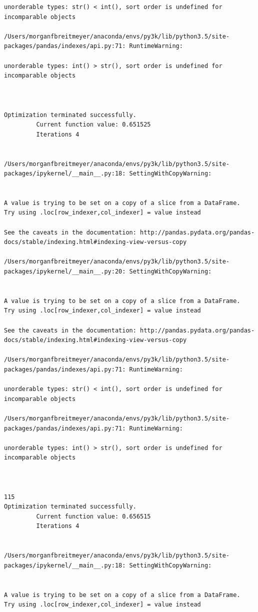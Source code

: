 \begin{lstlisting}
unorderable types: str() < int(), sort order is undefined for incomparable objects

/Users/morganfbreitmeyer/anaconda/envs/py3k/lib/python3.5/site-packages/pandas/indexes/api.py:71: RuntimeWarning:

unorderable types: int() > str(), sort order is undefined for incomparable objects



Optimization terminated successfully.
         Current function value: 0.651525
         Iterations 4


/Users/morganfbreitmeyer/anaconda/envs/py3k/lib/python3.5/site-packages/ipykernel/__main__.py:18: SettingWithCopyWarning:


A value is trying to be set on a copy of a slice from a DataFrame.
Try using .loc[row_indexer,col_indexer] = value instead

See the caveats in the documentation: http://pandas.pydata.org/pandas-docs/stable/indexing.html#indexing-view-versus-copy

/Users/morganfbreitmeyer/anaconda/envs/py3k/lib/python3.5/site-packages/ipykernel/__main__.py:20: SettingWithCopyWarning:


A value is trying to be set on a copy of a slice from a DataFrame.
Try using .loc[row_indexer,col_indexer] = value instead

See the caveats in the documentation: http://pandas.pydata.org/pandas-docs/stable/indexing.html#indexing-view-versus-copy

/Users/morganfbreitmeyer/anaconda/envs/py3k/lib/python3.5/site-packages/pandas/indexes/api.py:71: RuntimeWarning:

unorderable types: str() < int(), sort order is undefined for incomparable objects

/Users/morganfbreitmeyer/anaconda/envs/py3k/lib/python3.5/site-packages/pandas/indexes/api.py:71: RuntimeWarning:

unorderable types: int() > str(), sort order is undefined for incomparable objects



115
Optimization terminated successfully.
         Current function value: 0.656515
         Iterations 4


/Users/morganfbreitmeyer/anaconda/envs/py3k/lib/python3.5/site-packages/ipykernel/__main__.py:18: SettingWithCopyWarning:


A value is trying to be set on a copy of a slice from a DataFrame.
Try using .loc[row_indexer,col_indexer] = value instead


\end{lstlisting}
